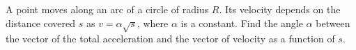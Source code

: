 
\item A point moves along an arc of a circle of radius \( R \). Its velocity depends on the distance covered \( s \) as \( v = \alpha\sqrt{s} \), where \( \alpha \) is a constant. Find the angle \( \alpha \) between the vector of the total acceleration and the vector of velocity as a function of \( s \).
